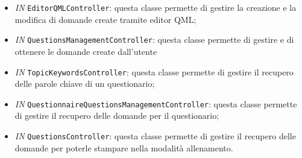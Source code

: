 \begin{itemize}
\begin{itemize}
		\item \textit{IN} \texttt{EditorQMLController}: questa classe permette di gestire la creazione e la modifica di domande create tramite editor QML;
		\item \textit{IN} \texttt{QuestionsManagementController}: questa classe permette di gestire e di ottenere le domande create dall'utente
		\item \textit{IN} \texttt{TopicKeywordsController}: questa classe permette di gestire il recupero delle parole chiave di un questionario;
		\item \textit{IN} \texttt{QuestionnaireQuestionsManagementController}: questa classe permette di gestire il recupero delle domande per il questionario;
		\item \textit{IN} \texttt{QuestionsController}: questa classe permette di gestire il recupero delle domande per poterle stampare nella modalità allenamento.
		

\end{itemize}
\end{itemize}
